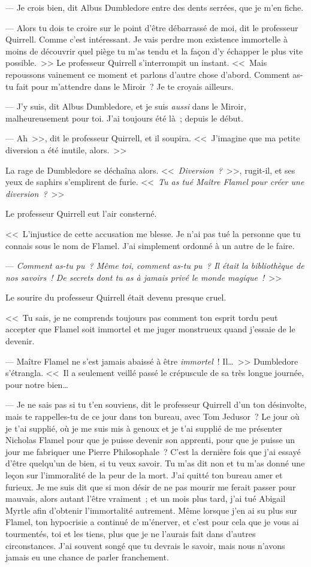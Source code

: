 --- Je crois bien, dit Albus Dumbledore entre des dents serrées, que je m'en fiche.

--- Alors tu dois te croire sur le point d'être débarrassé de moi, dit le professeur Quirrell. Comme c'est intéressant. Je vais perdre mon existence immortelle à moins de découvrir quel piège tu m'as tendu et la façon d'y échapper le plus vite possible.~>> Le professeur Quirrell s'interrompit un instant. <<~Mais repoussons vainement ce moment et parlons d'autre chose d'abord. Comment as-tu fait pour m'attendre dans le Miroir~? Je te croyais ailleurs.

--- J'y suis, dit Albus Dumbledore, et je suis \emph{aussi} dans le Miroir, malheureusement pour toi. J'ai toujours été là~; depuis le début.

--- Ah~>>, dit le professeur Quirrell, et il soupira. <<~J'imagine que ma petite diversion a été inutile, alors.~>>

La rage de Dumbledore se déchaîna alors. <<~\emph{Diversion~?}~>>, rugit-il, et ses yeux de saphirs s'emplirent de furie. <<~\emph{Tu as tué Maître Flamel pour créer une diversion~?}~>>

Le professeur Quirrell eut l'air consterné.

<<~L'injustice de cette accusation me blesse. Je n'ai pas tué la personne que tu connais sous le nom de Flamel. J'ai simplement ordonné à un autre de le faire.

--- \emph{Comment as-tu pu~? Même toi, comment as-tu pu~? Il était la bibliothèque de nos savoirs~! De secrets dont tu as à jamais privé le monde magique~!}~>>

Le sourire du professeur Quirrell était devenu presque cruel.

<<~Tu sais, je ne comprends toujours pas comment ton esprit tordu peut accepter que Flamel soit immortel et me juger monstrueux quand j'essaie de le devenir.

--- Maître Flamel ne s'est jamais abaissé à être \emph{immortel}~! Il…~>> Dumbledore s'étrangla. <<~Il a seulement veillé passé le crépuscule de sa très longue journée, pour notre bien…

--- Je ne sais pas si tu t'en souviens, dit le professeur Quirrell d'un ton désinvolte, mais te rappelles-tu de ce jour dans ton bureau, avec Tom Jedusor~? Le jour où je t'ai supplié, où je me suis mis à genoux et je t'ai supplié de me présenter Nicholas Flamel pour que je puisse devenir son apprenti, pour que je puisse un jour me fabriquer une Pierre Philosophale~? C'est la dernière fois que j'ai essayé d'être quelqu'un de bien, si tu veux savoir. Tu m'as dit non et tu m'as donné une leçon sur l'immoralité de la peur de la mort. J'ai quitté ton bureau amer et furieux. Je me suis dit que si mon désir de ne pas mourir me ferait passer pour mauvais, alors autant l'être vraiment~; et un mois plus tard, j'ai tué Abigail Myrtle afin d'obtenir l'immortalité autrement. Même lorsque j'en ai su plus sur Flamel, ton hypocrisie a continué de m'énerver, et c'est pour cela que je vous ai tourmentés, toi et les tiens, plus que je ne l'aurais fait dans d'autres circonstances. J'ai souvent songé que tu devrais le savoir, mais nous n'avons jamais eu une chance de parler franchement.

